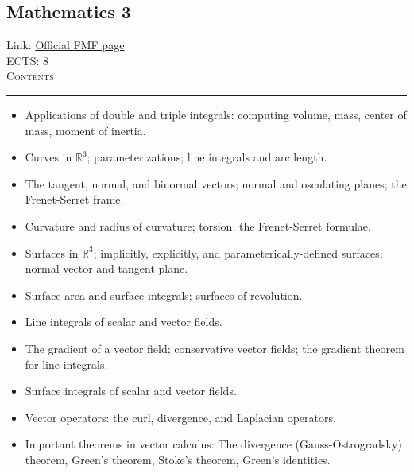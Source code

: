 \documentclass[11pt, a4paper]{article}
\newenvironment{course}[3]{
\subsection{#1}%
Link: \href{#2}{Official FMF page}\\%
ECTS: #3%
\vspace{1ex}
\\
{\large \textsc{Contents}}\\[-0.9ex]%
\rule{\textwidth}{0.5pt}
\vspace{-3ex}
}
{}
\newenvironment{chapter}[1]{
\begin{tcolorbox}[title=#1, breakable]
}
{\end{tcolorbox}}
\begin{document}
\begin{course}{Mathematics 3}{https://www.fmf.uni-lj.si/en/study-physics/programmes/1fiz/2020/7000777/courses/522/}{8}
\begin{chapter}{Multi-dimensional Riemann integration}
\begin{itemize}
            \item Applications of double and triple integrals: computing volume, mass, center of mass, moment of inertia.
        
        \end{itemize}
    \end{chapter}

    \begin{chapter}{Curves and surfaces in Euclidean space}
        \begin{itemize}
        
            \item Curves in $ \mathbb{R}^{3} $; parameterizations; line integrals and arc length.

            \item The tangent, normal, and binormal vectors; normal and osculating planes; the Frenet-Serret frame.

            \item Curvature and radius of curvature; torsion; the Frenet-Serret formulae.

            \item Surfaces in $ \mathbb{R}^{3} $; implicitly, explicitly, and parameterically-defined surfaces; normal vector and tangent plane.

            \item Surface area and surface integrals; surfaces of revolution.
        
        \end{itemize}

    \end{chapter}

    \begin{chapter}{Vector calculus}
        \begin{itemize}
        
            \item Line integrals of scalar and vector fields.

            \item The gradient of a vector field; conservative vector fields; the gradient theorem for line integrals.

            \item Surface integrals of scalar and vector fields.

            \item Vector operators: the curl, divergence, and Laplacian operators.

            \item Important theorems in vector calculus: The divergence (Gauss-Ostrogradsky) theorem, Green's theorem, Stoke's theorem, Green's identities.


\end{itemize}
\end{chapter}
\end{course}
\end{document}
